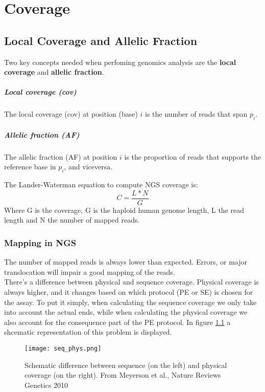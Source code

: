 \graphicspath{{chapters/02/}}
\chapter{Coverage}
\section{Local Coverage and Allelic Fraction}
Two key concepts needed when perfoming genomics analysis are the \textbf{local coverage} and \textbf{allelic fraction}.

	\paragraph*{Local coverage (cov)}
		The local coverage (cov) at position (base) $i$ is the number of reads that span $p_i$.
	\paragraph*{Allelic fraction (AF)}
		The allelic fraction (AF) at position $i$ is the proportion of reads that supports 			the reference base in $p_i$, and viceversa.

The Lander-Waterman equation to compute NGS coverage is:
\begin{equation}
C = \frac{L * N}{G}
\end{equation}
Where G is the coverage, G is the haploid human genome length, L the read length and N the number of mapped reads.

\subsection{Mapping in NGS}
The number of mapped reads is always lower than expected. Errors, or major translocation will impair a good mapping of the reads. \\
There's a difference between physical and sequence coverage. Physical coverage is always higher, and it changes based on which protocol (PE or SE) is chosen for the assay.
To put it simply, when calculating the sequence coverage we only take into account the actual ends, while when calculating the physical coverage we also account for the consequence part of the PE protocol. In figure \ref{fig:seq_phys} a  shcematic representation of this problem is displayed.
\begin{figure}[H]
    \centering
    \texttt{[image: seq\_phys.png]}
    \caption{Schematic difference between sequence (on the left) and physical coverage (on the right). From Meyerson et al., Nature Reviews Genetics 2010}
    \label{fig:seq_phys}
\end{figure}

